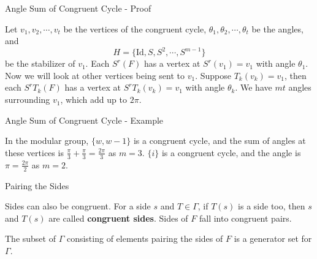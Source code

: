 \documentclass[
	american,
	sections numbered,
	usenames,
	xcolor=dvipsnames,
	aspectratio=169,
]{beamer}
\newcommand{\vocab}[1]{\textbf{\color{blue}\sffamily #1}}
\theoremstyle{plain}%
\begin{document}
\begin{frame}{Angle Sum of Congruent Cycle - Proof}

	Let $v_1,v_2,\cdots,v_t$ be the vertices of the congruent cycle, $\theta_1,\theta_2,\cdots,\theta_t$ be the angles, and $$H=\{\text{Id},S,S^2,\cdots,S^{m-1}\}$$ be the stabilizer of $v_1$. Each $S^r(F)$ has a vertex at $S^r(v_1)=v_1$ with angle $\theta_1$. Now we will look at other vertices being sent to $v_1$. Suppose $T_k(v_k)=v_1$, then each $S^rT_k(F)$ has a vertex at $S^rT_k(v_k)=v_1$ with angle $\theta_k$. We have $mt$ angles surrounding $v_1$, which add up to $2\pi$.

\end{frame}

\begin{frame}{Angle Sum of Congruent Cycle - Example}

    \begin{minipage}{0.49\textwidth}
		\begin{center}
        \end{center}
	\end{minipage}
	\begin{minipage}{0.5\textwidth}
		In the modular group, $\{w,w-1\}$ is a congruent cycle, and the sum of angles at these vertices is $\frac{\pi}{3}+\frac{\pi}{3}=\frac{2\pi}{3}$ as $m=3$. $\{i\}$ is a congruent cycle, and the angle is $\pi=\frac{2\pi}{2}$ as $m=2$.
	\end{minipage}

\end{frame}

\begin{frame}{Pairing the Sides}

	Sides can also be congruent. For a side $s$ and $T\in\Gamma$, if $T(s)$ is a side too, then $s$ and $T(s)$ are called \vocab{congruent sides}. Sides of $F$ fall into congruent pairs.

    \begin{theorem}\label<1>{thm:genset}
    The subset of $\Gamma$ consisting of elements pairing the sides of $F$ is a generator set for $\Gamma$.
    \end{theorem}

\end{frame}
\end{document}
